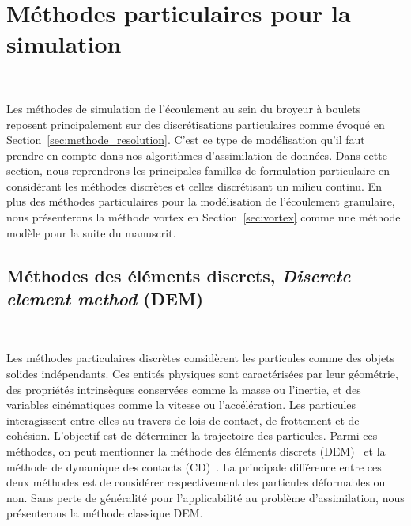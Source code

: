 
\section{Méthodes particulaires pour la simulation}~\label{sec:simu_part}

Les méthodes de simulation de l'écoulement au sein du broyeur à boulets reposent principalement sur des discrétisations particulaires comme évoqué en Section~\ref{sec:methode_resolution}. C'est ce type de modélisation qu'il faut prendre en compte dans nos algorithmes d'assimilation de données. Dans cette section, nous reprendrons les principales familles de formulation particulaire en considérant les méthodes discrètes et celles discrétisant un milieu continu. En plus des méthodes particulaires pour la modélisation de l'écoulement granulaire, nous présenterons la méthode vortex en Section~\ref{sec:vortex} comme une méthode modèle pour la suite du manuscrit.

\subsection{Méthodes des éléments discrets, \textit{Discrete element method} (DEM)}~\label{sec:part_discret}

Les méthodes particulaires discrètes considèrent les particules comme des objets solides indépendants. Ces entités physiques sont caractérisées par leur géométrie, des propriétés intrinsèques conservées comme la masse ou l'inertie, et des variables cinématiques comme la vitesse ou l'accélération. Les particules interagissent entre elles au travers de lois de contact, de frottement et de cohésion. L'objectif est de déterminer la trajectoire des particules. Parmi ces méthodes, on peut mentionner la méthode des éléments discrets (DEM)~\cite{radjai:hal-00691805} et la méthode de dynamique des contacts (CD)~\cite{moreau:hal-01824750}. La principale différence entre ces deux méthodes est de considérer respectivement des particules déformables ou non. Sans perte de généralité pour l'applicabilité au problème d'assimilation, nous présenterons la méthode classique DEM.

